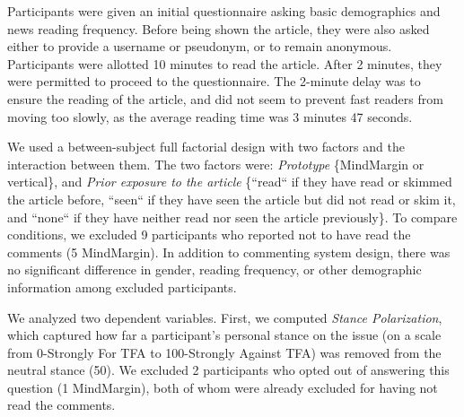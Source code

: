 Participants were given an initial questionnaire asking basic demographics and news reading frequency. Before being shown the article, they were also asked either to provide a username or pseudonym, or to remain anonymous. Participants were allotted 10 minutes to read the article. After 2 minutes, they were permitted to proceed to the questionnaire. The 2-minute delay was to ensure the reading of the article, and did not seem to prevent fast readers from moving too slowly, as the average reading time was 3 minutes 47 seconds. 


We used a between-subject full factorial design with two factors and the interaction between them. The two factors were: {\it Prototype} \{MindMargin or vertical\}, and {\it Prior exposure to the article} \{``read`` if they have read or skimmed the article before, ``seen`` if they have seen the article but did not read or skim it, and ``none`` if they have neither read nor seen the article previously\}. To compare conditions, we excluded 9 participants who reported not to have read the comments (5 MindMargin). In addition to commenting system design, there was no significant difference in gender, reading frequency, or other demographic information among excluded participants.

We analyzed two dependent variables.  First, we computed {\it Stance Polarization}, which captured how far a participant's personal stance on the issue (on a scale from 0-Strongly For TFA to 100-Strongly Against TFA) was removed from the neutral stance (50).  We excluded 2 participants who opted out of answering this question (1 MindMargin), both of whom were already excluded for having not read the comments.


